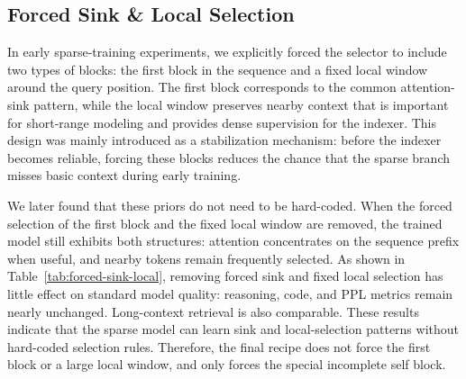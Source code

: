 \subsection{Forced Sink \& Local Selection}
\label{app:prelim-sink-local}

In early sparse-training experiments, we explicitly forced the selector to include two types of blocks: the first block in the sequence and a fixed local window around the query position. The first block corresponds to the common attention-sink pattern, while the local window preserves nearby context that is important for short-range modeling and provides dense supervision for the indexer. This design was mainly introduced as a stabilization mechanism: before the indexer becomes reliable, forcing these blocks reduces the chance that the sparse branch misses basic context during early training.

We later found that these priors do not need to be hard-coded. When the forced selection of the first block and the fixed local window are removed, the trained model still exhibits both structures: attention concentrates on the sequence prefix when useful, and nearby tokens remain frequently selected.
As shown in Table~\ref{tab:forced-sink-local}, removing forced sink and fixed local selection has little effect on standard model quality: reasoning, code, and PPL metrics remain nearly unchanged. Long-context retrieval is also comparable.
These results indicate that the sparse model can learn sink and local-selection patterns without hard-coded selection rules. Therefore, the final recipe does not force the first block or a large local window, and only forces the special incomplete self block.



